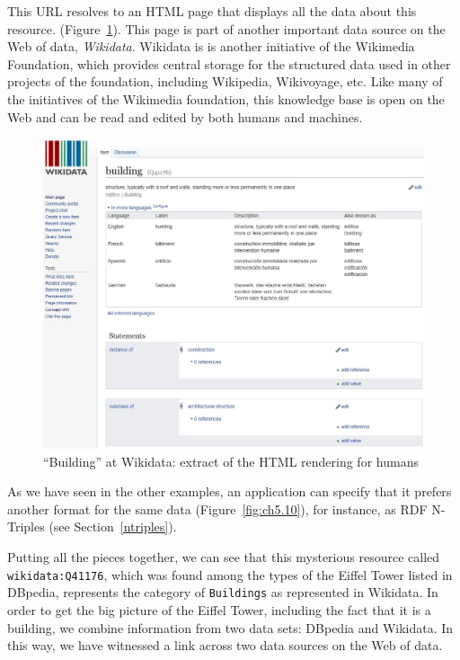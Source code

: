 This URL resolves to an HTML page that displays all the data about this
resource.   
(Figure~\ref{fig:ch5.9}). This page is part of another important  data source on the Web of data, 
\emph{Wikidata}. Wikidata is  is another initiative of the Wikimedia Foundation, which provides 
central storage for the structured data used in other projects of the
foundation,  including Wikipedia, Wikivoyage, etc.  Like many of the initiatives of the Wikimedia foundation, this knowledge
base is open on the Web and can be read and edited by both humans and
machines.

\begin{figure}
    \centering
    \includegraphics[width=5.0in]{media/ch5/figure-05-09.jpg}
    \caption{``Building'' at Wikidata: extract of the HTML rendering for humans}
    \label{fig:ch5.9}
\end{figure}

As we have seen in the other examples, an application can specify that it prefers  another format for 
the same data (Figure~\ref{fig:ch5.10}), for
instance,  as  RDF N-Triples (see Section~\ref{ntriples}).  

Putting  all the pieces
together, we can see that this mysterious resource called \texttt{wikidata:Q41176},
which  was found among the types of the Eiffel Tower listed in DBpedia, represents the
category of \texttt{Buildings} as represented in  Wikidata.   
In order to get the big picture of the Eiffel Tower, 
including the fact that it is a building, we combine information from two data sets: DBpedia and Wikidata. 
In this way, we have
witnessed a link across two data sources on the Web of data.

